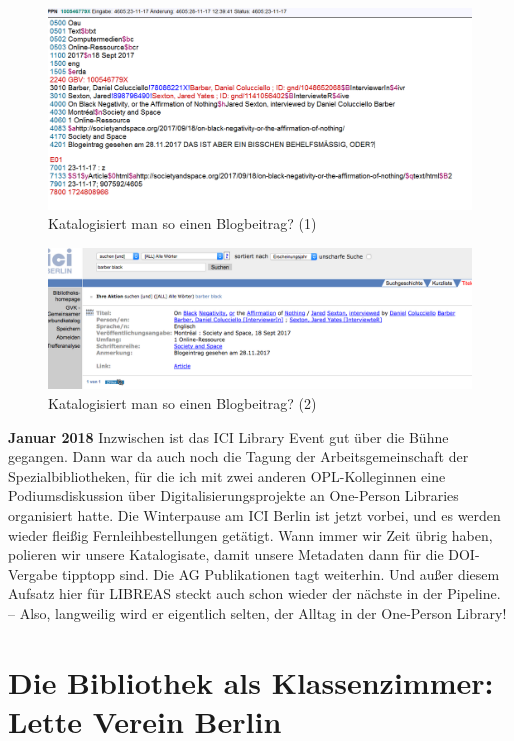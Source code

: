 \documentclass[a4paper,
fontsize=11pt,
oneside,
numbers=noperiodatend,
parskip=half-,
bibliography=totoc,
final
]{scrartcl}
\begin{document}
\begin{figure}
\centering
\includegraphics{img/Haas_5.png}
\caption{Katalogisiert man so einen Blogbeitrag? (1)}
\end{figure}

\begin{figure}
\centering
\includegraphics{img/Haas_6.png}
\caption{Katalogisiert man so einen Blogbeitrag? (2)}
\end{figure}

\textbf{Januar 2018} Inzwischen ist das ICI Library Event gut über die
Bühne gegangen. Dann war da auch noch die Tagung der Arbeitsgemeinschaft
der Spezialbibliotheken, für die ich mit zwei anderen OPL-Kolleginnen
eine Podiumsdiskussion über Digitalisierungsprojekte an One-Person
Libraries organisiert hatte. Die Winterpause am ICI Berlin ist jetzt
vorbei, und es werden wieder fleißig Fernleihbestellungen getätigt. Wann
immer wir Zeit übrig haben, polieren wir unsere Katalogisate, damit
unsere Metadaten dann für die DOI-Vergabe tipptopp sind. Die AG
Publikationen tagt weiterhin. Und außer diesem Aufsatz hier für LIBREAS
steckt auch schon wieder der nächste in der Pipeline. -- Also,
langweilig wird er eigentlich selten, der Alltag in der One-Person
Library!

\hypertarget{die-bibliothek-als-klassenzimmer-lette-verein-berlin}{%
\section{Die Bibliothek als Klassenzimmer: Lette Verein
Berlin}\label{die-bibliothek-als-klassenzimmer-lette-verein-berlin}}
\end{document}
